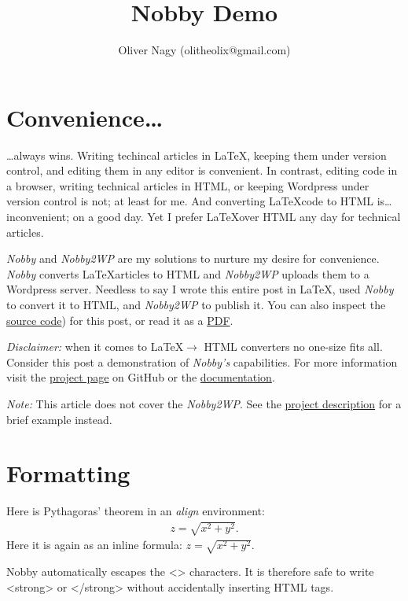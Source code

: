 \documentclass[10pt]{article}
\title{Nobby Demo}
\author{Oliver Nagy (olitheolix@gmail.com)}
\begin{document}
\maketitle

\section{Convenience\ldots}
\ldots always wins. Writing techincal articles in \LaTeX, keeping them
under version control, and editing them in any editor is
convenient. In contrast, editing code in a browser, writing technical
articles in HTML, or keeping Wordpress under version control is not;
at least for me. And converting \LaTeX  code to HTML is\ldots
inconvenient; on a good day. Yet I prefer \LaTeX over HTML any day for
technical articles.

\emph{Nobby} and \emph{Nobby2WP} are my solutions to nurture my desire
for convenience. \emph{Nobby} converts \LaTeX articles to HTML
and \emph{Nobby2WP} uploads them to a Wordpress server. Needless to
say I wrote this entire post in \LaTeX, used \emph{Nobby} to convert
it to HTML, and \emph{Nobby2WP} to publish it. You can also inspect the
\href{https://github.com/olitheolix/nobby/blob/master/demo/demo.tex}{source
code}) for this post, or read it as a  \href{./demo.pdf}{PDF}.

\emph{Disclaimer:} when it comes to \LaTeX $\to $ HTML converters no
one-size fits all. Consider this post a demonstration of
\emph{Nobby's} capabilities. For more information visit the
\href{https://github.com/olitheolix/nobby}{project page} on GitHub or
the \href{https://olitheolix.com/doc/nobby}{documentation}.

\emph{Note:} This article does not cover the \emph{Nobby2WP}. See 
the \href{https://github.com/olitheolix/nobby}{project description}
for a brief example instead.

\section{Formatting}
\label{sec:one}
Here is Pythagoras' theorem in an \emph{align} environment:
\begin{align}
  \label{eq:pyth}
  z = \sqrt{x^2 + y^2}.
\end{align}
Here it is again as an inline formula: $z = \sqrt{x^2 + y^2}$.

Nobby automatically escapes the <> characters. It is therefore safe to
write <strong> or </strong> without accidentally inserting HTML tags.
\end{document}
